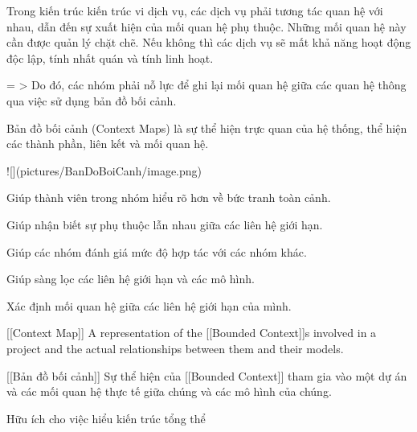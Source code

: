 Trong kiến trúc kiến trúc vi dịch vụ, các dịch vụ phải tương tác quan hệ với nhau, dẫn đến sự xuất hiện của mối quan hệ phụ thuộc. Những mối quan hệ này cần được quản lý chặt chẽ. Nếu không thì các dịch vụ sẽ mất khả năng hoạt động độc lập, tính nhất quán và tính linh hoạt.

= > Do đó, các nhóm phải nỗ lực để ghi lại mối quan hệ giữa các quan hệ thông qua việc sử dụng bản đồ bối cảnh.

Bản đồ bối cảnh (Context Maps) là sự thể hiện trực quan của hệ thống, thể hiện các thành phần, liên kết và mối quan hệ.

![](pictures/BanDoBoiCanh/image.png)



Giúp thành viên trong nhóm hiểu rõ hơn về bức tranh toàn cảnh.

Giúp nhận biết sự phụ thuộc lẫn nhau giữa các liên hệ giới hạn.

Giúp các nhóm đánh giá mức độ hợp tác với các nhóm khác.

Giúp sàng lọc các liên hệ giới hạn và các mô hình.

Xác định mối quan hệ giữa các liên hệ giới hạn của mình.


[[Context Map]] A representation of the [[Bounded Context]]s involved in a project and the actual relationships between them and their models.

[[Bản đồ bối cảnh]] Sự thể hiện của [[Bounded Context]] tham gia vào một dự án và các mối quan hệ thực tế giữa chúng và các mô hình của chúng.

Hữu ích cho việc hiểu kiến trúc tổng thể







